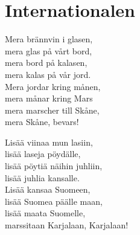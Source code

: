 \section{Internationalen}

Mera brännvin i glasen,\\
mera glas på vårt bord,\\
mera bord på kalasen,\\
mera kalas på vår jord.\\
Mera jordar kring månen,\\
mera månar kring Mars\\
mera marscher till Skåne,\\
mera Skåne, bevars!

Lisää viinaa mun lasiin,\\
lisää laseja pöydälle,\\
lisää pöytiä näihin juhliin,\\
lisää juhlia kansalle.\\
Lisää kansaa Suomeen,\\
lisää Suomea päälle maan,\\
lisää maata Suomelle,\\
marssitaan Karjalaan, Karjalaan!